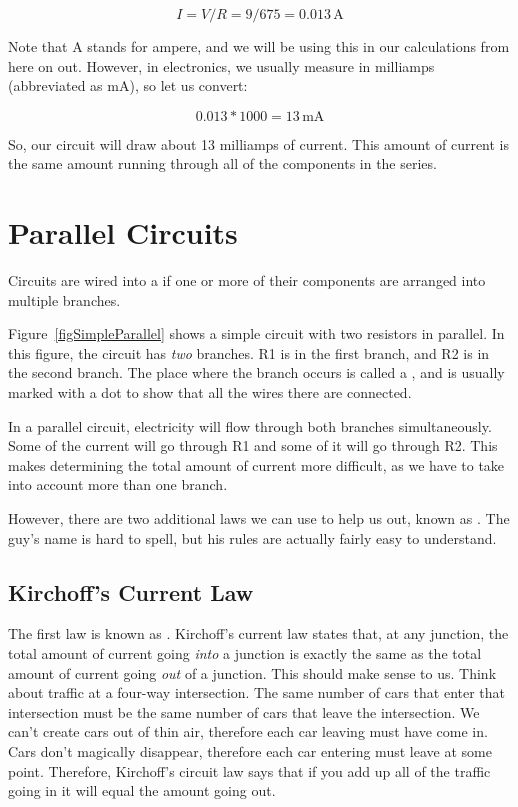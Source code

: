 $$I = V / R = 9 / 675 = 0.013\,\si{\ampere}$$

Note that \si{\ampere} stands for ampere, and we will be using this in our calculations from here on out.
However, in electronics, we usually measure in milliamps (abbreviated as \si{\milli\ampere}), so let us convert:

$$ 0.013 * 1000 = 13\,\si{\milli\ampere}$$

So, our circuit will draw about 13 milliamps of current.
This amount of current is the same amount running through all of the components in the series.

\section{Parallel Circuits}

Circuits are wired into a  if one or more of their components are arranged into multiple branches.

Figure~\ref{figSimpleParallel} shows a simple circuit with two resistors in parallel.
In this figure, the circuit has \emph{two} branches.
R1 is in the first branch, and R2 is in the second branch.
The place where the branch occurs is called a , and is usually marked with a dot to show that all the wires there are connected.


In a parallel circuit, electricity will flow through both branches simultaneously.
Some of the current will go through R1 and some of it will go through R2.
This makes determining the total amount of current more difficult, as we have to take into account more than one branch.

However, there are two additional laws we can use to help us out, known as .
The guy's name is hard to spell, but his rules are actually fairly easy to understand.

\subsection{Kirchoff's Current Law}

The first law is known as .
Kirchoff's current law states that, at any junction, the total amount of current going \emph{into} a junction is exactly the same as the total amount of current going \emph{out} of a junction.
This should make sense to us.
Think about traffic at a four-way intersection.
The same number of cars that enter that intersection must be the same number of cars that leave the intersection.
We can't create cars out of thin air, therefore each car leaving must have come in.
Cars don't magically disappear, therefore each car entering must leave at some point.
Therefore, Kirchoff's circuit law says that if you add up all of the traffic going in it will equal the amount going out.

